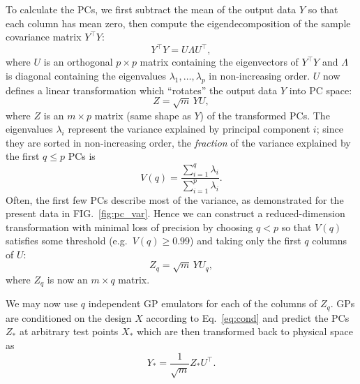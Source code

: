 \documentclass[aps,prc,reprint,superscriptaddress,amsmath]{revtex4-1}
\newcommand{\tran}{^\intercal}
\begin{document}
To calculate the PCs, we first subtract the mean of the output data $Y$ so that each column has mean zero, then compute the eigendecomposition of the sample covariance matrix $Y\tran Y$:
\begin{equation}
  Y\tran Y = U \Lambda U\tran,
  \label{eq:cov}
\end{equation}
where $U$ is an orthogonal $p \times p$ matrix containing the eigenvectors of $Y\tran Y$ and $\Lambda$ is diagonal containing the eigenvalues $\lambda_1, \ldots, \lambda_p$ in non-increasing order.
$U$ now defines a linear transformation which ``rotates'' the output data $Y$ into PC space:
\begin{equation}
  Z = \sqrt m \, YU,
\end{equation}
where $Z$ is an $m \times p$ matrix (same shape as $Y$) of the transformed PCs.
The eigenvalues $\lambda_i$ represent the variance explained by principal component $i$; since they are sorted in non-increasing order, the \emph{fraction} of the variance explained by the first $q \leq p$ PCs is
\begin{equation}
  V(q) = \frac{\sum_{i=1}^q \lambda_i}{\sum_{i=1}^p \lambda_i}.
\end{equation}
Often, the first few PCs describe most of the variance, as demonstrated for the present data in FIG.~\ref{fig:pc_var}.
Hence we can construct a reduced-dimension transformation with minimal loss of precision by choosing $q < p$ so that $V(q)$ satisfies some threshold (e.g.~$V(q) \geq 0.99$) and taking only the first $q$ columns of $U$:
\begin{equation}
  Z_q = \sqrt m \, YU_q,
\end{equation}
where $Z_q$ is now an $m \times q$ matrix.

We may now use $q$ independent GP emulators for each of the columns of $Z_q$.
GPs are conditioned on the design $X$ according to Eq.~\eqref{eq:cond} and predict the PCs $Z_*$ at arbitrary test points $X_*$ which are then transformed back to physical space as
\begin{equation}
  Y_* = \frac{1}{\sqrt m} Z_* U\tran.
\end{equation}
\end{document}
